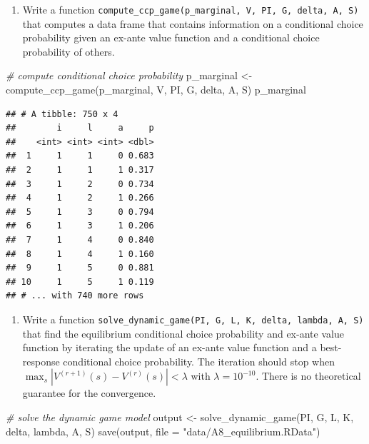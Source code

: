 \documentclass[
]{book}
\newenvironment{Shaded}{\begin{snugshade}}{\end{snugshade}}
\newcommand{\AttributeTok}[1]{\textcolor[rgb]{0.77,0.63,0.00}{#1}}
\newcommand{\CommentTok}[1]{\textcolor[rgb]{0.56,0.35,0.01}{\textit{#1}}}
\newcommand{\FunctionTok}[1]{\textcolor[rgb]{0.00,0.00,0.00}{#1}}
\newcommand{\NormalTok}[1]{#1}
\newcommand{\OtherTok}[1]{\textcolor[rgb]{0.56,0.35,0.01}{#1}}
\newcommand{\StringTok}[1]{\textcolor[rgb]{0.31,0.60,0.02}{#1}}
\providecommand{\tightlist}{%
  \setlength{\itemsep}{0pt}\setlength{\parskip}{0pt}}
\begin{document}
\begin{enumerate}
\def\labelenumi{\arabic{enumi}.}
\setcounter{enumi}{9}
\tightlist
\item
  Write a function \texttt{compute\_ccp\_game(p\_marginal,\ V,\ PI,\ G,\ delta,\ A,\ S)} that computes a data frame that contains information on a conditional choice probability given an ex-ante value function and a conditional choice probability of others.
\end{enumerate}

\begin{Shaded}
\begin{Highlighting}[]
\CommentTok{\# compute conditional choice probability }
\NormalTok{p\_marginal }\OtherTok{\textless{}{-}} \FunctionTok{compute\_ccp\_game}\NormalTok{(p\_marginal, V, PI, G, delta, A, S)}
\NormalTok{p\_marginal}
\end{Highlighting}
\end{Shaded}

\begin{verbatim}
## # A tibble: 750 x 4
##        i     l     a     p
##    <int> <int> <int> <dbl>
##  1     1     1     0 0.683
##  2     1     1     1 0.317
##  3     1     2     0 0.734
##  4     1     2     1 0.266
##  5     1     3     0 0.794
##  6     1     3     1 0.206
##  7     1     4     0 0.840
##  8     1     4     1 0.160
##  9     1     5     0 0.881
## 10     1     5     1 0.119
## # ... with 740 more rows
\end{verbatim}

\begin{enumerate}
\def\labelenumi{\arabic{enumi}.}
\setcounter{enumi}{10}
\tightlist
\item
  Write a function \texttt{solve\_dynamic\_game(PI,\ G,\ L,\ K,\ delta,\ lambda,\ A,\ S)} that find the equilibrium conditional choice probability and ex-ante value function by iterating the update of an ex-ante value function and a best-response conditional choice probability. The iteration should stop when \(\max_s|V^{(r + 1)}(s) - V^{(r)}(s)| < \lambda\) with \(\lambda = 10^{-10}\). There is no theoretical guarantee for the convergence.
\end{enumerate}

\begin{Shaded}
\begin{Highlighting}[]
\CommentTok{\# solve the dynamic game model}
\NormalTok{output }\OtherTok{\textless{}{-}}
  \FunctionTok{solve\_dynamic\_game}\NormalTok{(PI, G, L, K, delta, lambda, A, S)}
\FunctionTok{save}\NormalTok{(output, }\AttributeTok{file =} \StringTok{"data/A8\_equilibrium.RData"}\NormalTok{)}
\end{Highlighting}
\end{Shaded}
\end{document}
